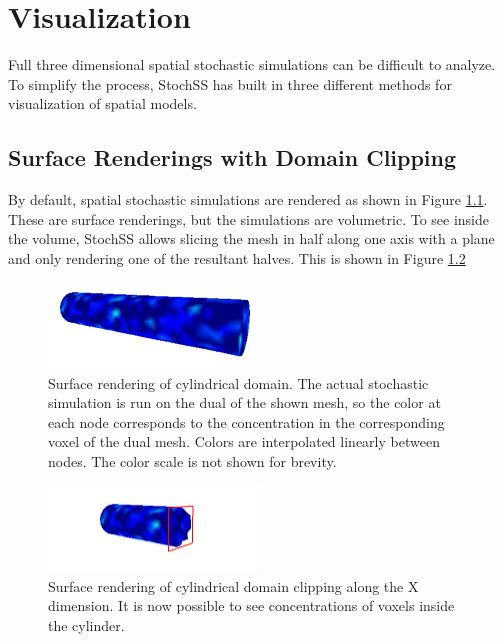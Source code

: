 
\chapter{Visualization}
Full three dimensional spatial stochastic simulations can be difficult to analyze. To simplify the process, StochSS has built in three different methods for visualization of spatial models.

\section{Surface Renderings with Domain Clipping}

By default, spatial stochastic simulations are rendered as shown in Figure \ref{surface}. These are surface renderings, but the simulations are volumetric. To see inside the volume, StochSS allows slicing the mesh in half along one axis with a plane and only rendering one of the resultant halves. This is shown in Figure \ref{clipx}

\begin{figure}[!ht]
  \centering
    \includegraphics[width=0.5\textwidth]{Vis/surface}
  \caption{ Surface rendering of cylindrical domain. The actual stochastic simulation is run on the dual of the shown mesh, so the color at each node corresponds to the concentration in the corresponding voxel of the dual mesh. Colors are interpolated linearly between nodes. The color scale is not shown for brevity. }
  \label{surface}
\end{figure}

\begin{figure}[!ht]
  \centering
    \includegraphics[width=0.5\textwidth]{Vis/clipx}
  \caption{ Surface rendering of cylindrical domain clipping along the X dimension. It is now possible to see concentrations of voxels inside the cylinder. }
  \label{clipx}
\end{figure}

